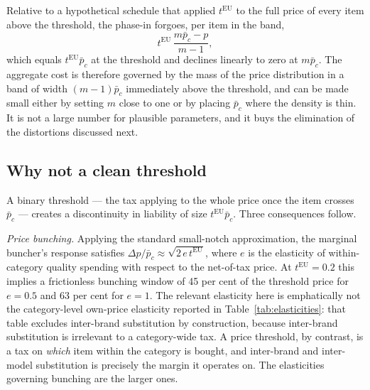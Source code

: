 Relative to a hypothetical schedule that applied $t^{\mathrm{EU}}$ to the full price of every item
above the threshold, the phase-in forgoes, per item in the band,
\begin{equation}
t^{\mathrm{EU}}\,\frac{m\bar{p}_c - p}{m-1},
\label{eq:forgone}
\end{equation}
which equals $t^{\mathrm{EU}}\bar{p}_c$ at the threshold and declines linearly to zero at
$m\bar{p}_c$. The aggregate cost is therefore governed by the mass of the price distribution in a
band of width $(m-1)\bar{p}_c$ immediately above the threshold, and can be made small either by
setting $m$ close to one or by placing $\bar{p}_c$ where the density is thin. It is not a large
number for plausible parameters, and it buys the elimination of the distortions discussed next.

\subsection{Why not a clean threshold}
\label{sec:nonotch}

A binary threshold --- the tax applying to the whole price once the item crosses $\bar{p}_c$ ---
creates a discontinuity in liability of size $t^{\mathrm{EU}}\bar{p}_c$. Three consequences follow.

\emph{Price bunching.} Applying the standard small-notch approximation, the marginal buncher's
response satisfies $\Delta p / \bar{p}_c \approx \sqrt{2\,e\,t^{\mathrm{EU}}}$, where $e$ is the
elasticity of within-category quality spending with respect to the net-of-tax price. At
$t^{\mathrm{EU}}=0.2$ this implies a frictionless bunching window of 45 per cent of the threshold
price for $e=0.5$ and 63 per cent for $e=1$. The relevant elasticity here is emphatically not the
category-level own-price elasticity reported in Table~\ref{tab:elasticities}: that table excludes
inter-brand substitution by construction, because inter-brand substitution is irrelevant to a
category-wide tax. A price threshold, by contrast, is a tax on \emph{which} item within the category
is bought, and inter-brand and inter-model substitution is precisely the margin it operates on. The
elasticities governing bunching are the larger ones.

